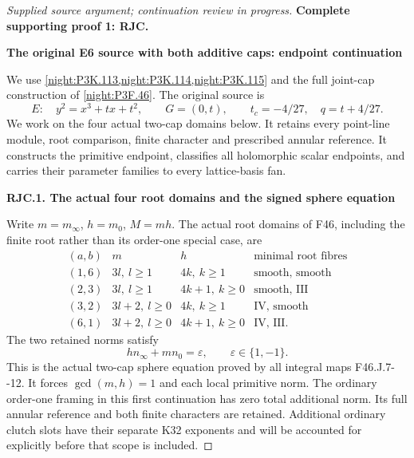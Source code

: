 \begin{proof}[Supplied source argument; continuation review in progress]

\par\bigskip\noindent\textbf{Complete supporting proof 1: RJC.}\par




\par

\medskip\noindent\textbf{The original E6 source with both additive caps: endpoint continuation}

\par\nobreak

We use \cref{night:P3K.113,night:P3K.114,night:P3K.115} and the full joint-cap construction of \cref{night:P3F.46}.
The original source is
\[
 E:\quad y^2=x^3+tx+t^2,\qquad G=(0,t),\qquad
 t_c=-4/27,\quad q=t+4/27.                         \tag{RJC.1}
\]
We work on the four actual two-cap domains below. It retains every point-line module, root comparison,
finite character and prescribed annular reference. It constructs the
primitive endpoint, classifies all holomorphic scalar endpoints, and
carries their parameter families to every lattice-basis fan.

\par

\medskip\noindent\textbf{RJC.1. The actual four root domains and the signed sphere equation}

\par\nobreak

Write \(m=m_\infty\), \(h=m_0\), \(M=mh\). The actual root domains of
F46, including the finite root rather than its order-one special case, are
\[
\begin{array}{c|c|c|c}
 (a,b)&m&h&\text{minimal root fibres}\\ \hline
 (1,6)&3l,\ l\ge1&4k,\ k\ge1&\text{smooth, smooth}\\
 (2,3)&3l,\ l\ge1&4k+1,\ k\ge0&\text{smooth, III}\\
 (3,2)&3l+2,\ l\ge0&4k,\ k\ge1&\text{IV, smooth}\\
 (6,1)&3l+2,\ l\ge0&4k+1,\ k\ge0&\text{IV, III}.
\end{array}                                                        \tag{RJC.2}
\]
The two retained norms satisfy
\[
 hn_\infty+mn_0=\varepsilon,\qquad \varepsilon\in\{1,-1\}.             \tag{RJC.3}
\]
This is the actual two-cap sphere equation proved by all integral maps
F46.J.7-\/-12. It forces \(\gcd(m,h)=1\) and each local primitive norm.
The ordinary order-one framing in this first continuation has zero total
additional norm. Its full annular reference and both finite characters
are retained. Additional ordinary clutch slots have their separate
K32 exponents and will be accounted for explicitly before that scope is
included.


\end{proof}
